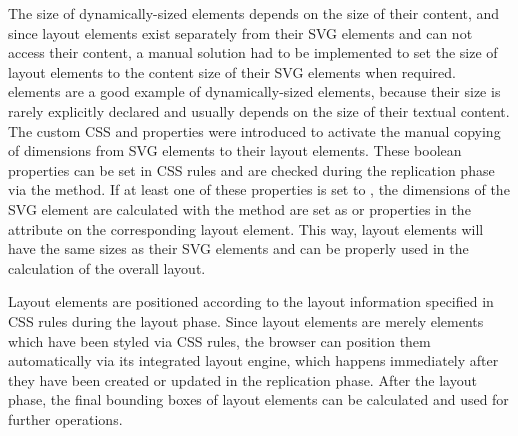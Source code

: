 The size of dynamically-sized elements depends on the size of their
content, and since layout elements exist separately from their SVG
elements and can not access their content, a manual solution had to be
implemented to set the size of layout elements to the content size of
their SVG elements when required.  elements are a good
example of dynamically-sized elements, because their size is rarely
explicitly declared and usually depends on the size of their textual
content. The custom CSS  and
 properties were introduced to activate the
manual copying of dimensions from SVG elements to their layout
elements. These boolean properties can be set in CSS rules and are
checked during the replication phase via the
 method. If at least one of these
properties is set to , the dimensions of the SVG element
are calculated with the  method
are set as  or  properties in the
 attribute on the corresponding layout element. This
way, layout elements will have the same sizes as their SVG elements
and can be properly used in the calculation of the overall layout.

Layout elements are positioned according to the layout information
specified in CSS rules during the layout phase. Since layout elements
are merely  elements which have been styled via CSS rules,
the browser can position them automatically via its integrated layout
engine, which happens immediately after they have been created or
updated in the replication phase. After the layout phase, the final
bounding boxes of layout elements can be calculated and used for
further operations.

